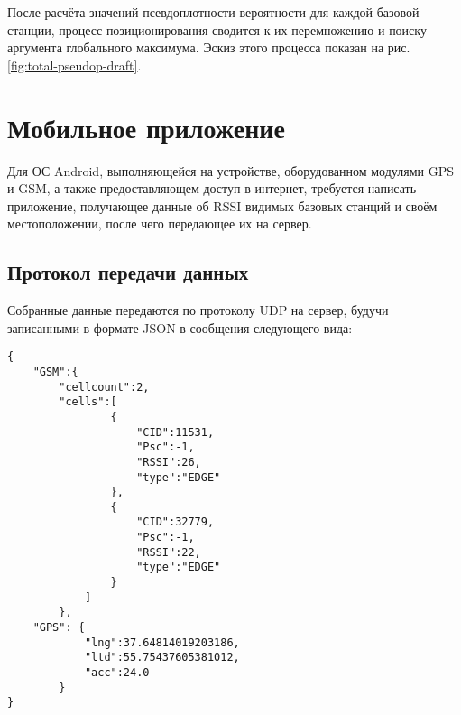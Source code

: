 После расчёта значений псевдоплотности вероятности для каждой базовой станции, процесс позиционирования сводится к их перемножению и поиску аргумента глобального максимума. Эскиз этого процесса показан на рис. \ref{fig:total-pseudop-draft}.

\section{Мобильное приложение}
Для ОС Android, выполняющейся на устройстве, оборудованном модулями GPS и GSM, а также предоставляющем доступ в интернет, требуется написать приложение, получающее данные об RSSI видимых базовых станций и своём местоположении, после чего передающее их на сервер.

\subsection{Протокол передачи данных}
Собранные данные передаются по протоколу UDP на сервер, будучи записанными в формате JSON в сообщения следующего вида:


\lstset{language=Python}
\begin{lstlisting}
{
	"GSM":{
		"cellcount":2, 
		"cells":[
				{
					"CID":11531, 
					"Psc":-1,
					"RSSI":26,
					"type":"EDGE"
				}, 
				{
					"CID":32779,
					"Psc":-1,
					"RSSI":22,
					"type":"EDGE"
				}
			]
		},
	"GPS": {
			"lng":37.64814019203186,
			"ltd":55.75437605381012,
			"acc":24.0
		}
}
\end{lstlisting}

